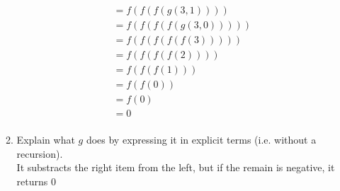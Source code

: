 \documentclass{article}
\begin{document}
\begin{enumerate}
\begin{enumerate}
\begin{align*}
            &= f(f(f(g(3, 1))))\\
            &= f(f(f(f(g(3, 0)))))\\
            &= f(f(f(f(f(3)))))\\
            &= f(f(f(f(2))))\\
            &= f(f(f(1)))\\
            &= f(f(0))\\
            &= f(0)\\
            &= 0\\
        \end{align*}
        \item Explain what $g$ does by expressing it in explicit terms (i.e. without a recursion).\\
        It substracts the right item from the left, but if the remain is negative, it returns 0
    \end{enumerate}
\end{enumerate}
\end{document}

